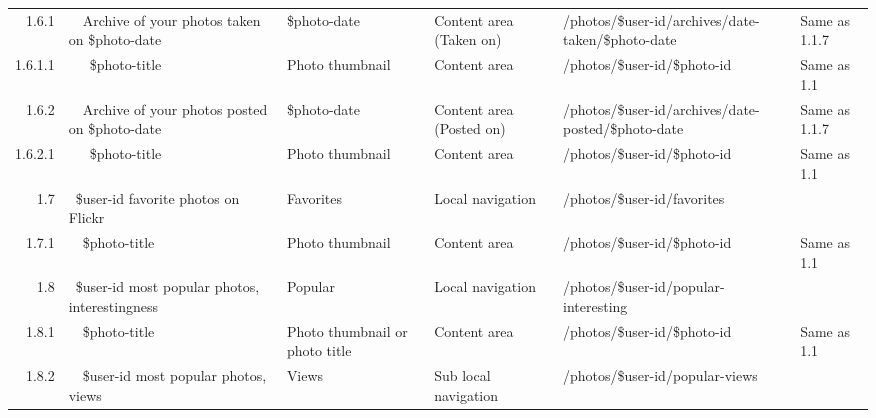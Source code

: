 \documentclass[12pt,a4paper]{article}
\begin{document}
\begin{landscape}
\begin{table}[h!b!p!]
\begin{center}
\begin{tiny}
\begin{tabular}{r|l|l|l|l|p{3cm}}
                1.6.1 &
                ~~Archive of your photos taken on \$photo-date &
                \$photo-date &
                Content area (Taken on) &
                /photos/\$user-id/archives/date-taken/\$photo-date &
                Same as 1.1.7 \\

                  1.6.1.1 &
                  ~~~\$photo-title &
                  Photo thumbnail &
                  Content area &
                  /photos/\$user-id/\$photo-id &
                  Same as 1.1 \\

                1.6.2 &
                ~~Archive of your photos posted on \$photo-date &
                \$photo-date &
                Content area (Posted on) &
                /photos/\$user-id/archives/date-posted/\$photo-date &
                Same as 1.1.7 \\

                  1.6.2.1 &
                  ~~~\$photo-title &
                  Photo thumbnail &
                  Content area &
                  /photos/\$user-id/\$photo-id &
                  Same as 1.1 \\

              1.7 &
              ~\$user-id favorite photos on Flickr &
              Favorites &
              Local navigation &
              /photos/\$user-id/favorites &
              \\

                1.7.1 &
                ~~\$photo-title &
                Photo thumbnail &
                Content area &
                /photos/\$user-id/\$photo-id &
                Same as 1.1 \\

              1.8 &
              ~\$user-id most popular photos, interestingness &
              Popular &
              Local navigation &
              /photos/\$user-id/popular-interesting &
              \\

                1.8.1 &
                ~~\$photo-title &
                Photo thumbnail or photo title &
                Content area &
                /photos/\$user-id/\$photo-id &
                Same as 1.1 \\

                1.8.2 &
                ~~\$user-id most popular photos, views &
                Views &
                Sub local navigation &
                /photos/\$user-id/popular-views &
                \\


\end{tabular}
\end{tiny}
\end{center}
\end{table}
\end{landscape}
\end{document}
